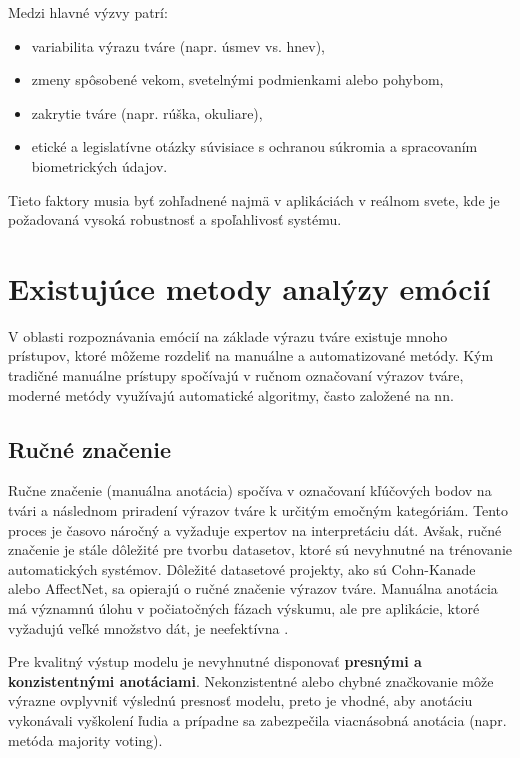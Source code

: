 Medzi hlavné výzvy patrí:

\begin{itemize}
    \item variabilita výrazu tváre (napr. úsmev vs. hnev),
    \item zmeny spôsobené vekom, svetelnými podmienkami alebo pohybom,
    \item zakrytie tváre (napr. rúška, okuliare),
    \item etické a legislatívne otázky súvisiace s ochranou súkromia a spracovaním biometrických údajov.
\end{itemize}

Tieto faktory musia byť zohľadnené najmä v aplikáciách v reálnom svete, kde je požadovaná vysoká robustnosť a spoľahlivosť systému.

\section{Existujúce metody analýzy emócií}
\label{sec:existing_methods}
V oblasti rozpoznávania emócií na základe výrazu tváre existuje mnoho prístupov, ktoré môžeme rozdeliť na manuálne a automatizované metódy. Kým tradičné manuálne prístupy spočívajú v ručnom označovaní 
výrazov tváre, moderné metódy využívajú automatické algoritmy, často založené na \gls{nn}.

\subsection{Ručné značenie}
Ručne značenie (manuálna anotácia) spočíva v označovaní kľúčových bodov na tvári a následnom priradení výrazov tváre k určitým emočným kategóriám. Tento proces je časovo náročný a vyžaduje expertov 
na interpretáciu dát. Avšak, ručné značenie je stále dôležité pre tvorbu datasetov, ktoré sú nevyhnutné na trénovanie automatických systémov. Dôležité datasetové projekty, ako sú Cohn-Kanade alebo AffectNet, 
sa opierajú o ručné značenie výrazov tváre. Manuálna anotácia má významnú úlohu v počiatočných fázach výskumu, ale pre aplikácie, ktoré vyžadujú veľké množstvo dát, je neefektívna \cite{article01}.

Pre kvalitný výstup modelu je nevyhnutné disponovať \textbf{presnými a konzistentnými anotáciami}. Nekonzistentné alebo chybné značkovanie môže výrazne ovplyvniť výslednú presnosť modelu, preto je vhodné, 
aby anotáciu vykonávali vyškolení ľudia a prípadne sa zabezpečila viacnásobná anotácia (napr. metóda majority voting).

